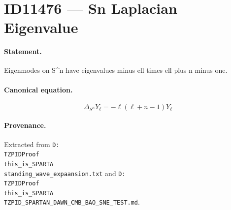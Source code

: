 \section*{ID11476 --- Sn Laplacian Eigenvalue}

\paragraph{Statement.}
Eigenmodes on S^n have eigenvalues minus ell times ell plus n minus one.

\paragraph{Canonical equation.}
\[
\Delta_{S^n}Y_\ell=-\ell(\ell+n-1)Y_\ell
\]

\paragraph{Provenance.}
Extracted from \texttt{D:\\TZPIDProof\\this\_is\_SPARTA\\standing\_wave\_expaansion.txt} and \texttt{D:\\TZPIDProof\\this\_is\_SPARTA\\TZPID\_SPARTAN\_DAWN\_CMB\_BAO\_SNE\_TEST.md}.
